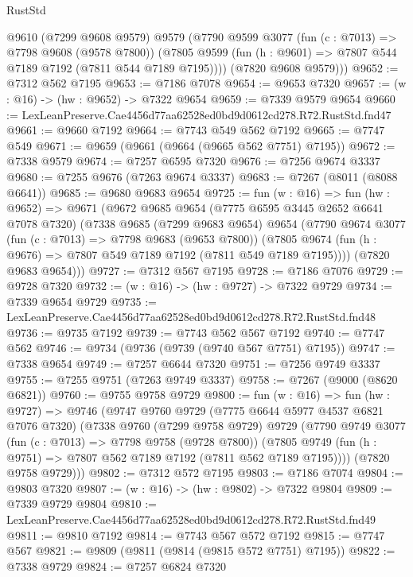 \begin{lexlean}{RustStd}
\begin{coremodule}
        @9610
        (@7299 @9608 @9579)
        @9579
        (@7790
          @9599
          @3077
          (fun (c : @7013) => @7798 @9608 (@9578 @7800))
          (@7805 @9599 (fun (h : @9601) => @7807 @544 @7189 @7192 (@7811 @544 @7189 @7195))))
        (@7820 @9608 @9579)))
@9652 := @7312 @562 @7195
@9653 := @7186 @7078
@9654 := @9653 @7320
@9657 := (w : @16) -> (hw : @9652) -> @7322 @9654
@9659 := @7339 @9579 @9654
@9660 := LexLeanPreserve.Cae4456d77aa62528ed0bd9d0612cd278.R72.RustStd.fnd47
@9661 := @9660 @7192
@9664 := @7743 @549 @562 @7192
@9665 := @7747 @549
@9671 := @9659 (@9661 (@9664 (@9665 @562 @7751) @7195))
@9672 := @7338 @9579
@9674 := @7257 @6595 @7320
@9676 := @7256 @9674 @3337
@9680 := @7255 @9676 (@7263 @9674 @3337)
@9683 := @7267 (@8011 (@8088 @6641))
@9685 := @9680 @9683 @9654
@9725 := fun (w : @16) =>
  fun (hw : @9652) =>
  @9671
    (@9672
      @9685
      @9654
      (@7775 @6595 @3445 @2652 @6641 @7078 @7320)
      (@7338
        @9685
        (@7299 @9683 @9654)
        @9654
        (@7790
          @9674
          @3077
          (fun (c : @7013) => @7798 @9683 (@9653 @7800))
          (@7805 @9674 (fun (h : @9676) => @7807 @549 @7189 @7192 (@7811 @549 @7189 @7195))))
        (@7820 @9683 @9654)))
@9727 := @7312 @567 @7195
@9728 := @7186 @7076
@9729 := @9728 @7320
@9732 := (w : @16) -> (hw : @9727) -> @7322 @9729
@9734 := @7339 @9654 @9729
@9735 := LexLeanPreserve.Cae4456d77aa62528ed0bd9d0612cd278.R72.RustStd.fnd48
@9736 := @9735 @7192
@9739 := @7743 @562 @567 @7192
@9740 := @7747 @562
@9746 := @9734 (@9736 (@9739 (@9740 @567 @7751) @7195))
@9747 := @7338 @9654
@9749 := @7257 @6644 @7320
@9751 := @7256 @9749 @3337
@9755 := @7255 @9751 (@7263 @9749 @3337)
@9758 := @7267 (@9000 (@8620 @6821))
@9760 := @9755 @9758 @9729
@9800 := fun (w : @16) =>
  fun (hw : @9727) =>
  @9746
    (@9747
      @9760
      @9729
      (@7775 @6644 @5977 @4537 @6821 @7076 @7320)
      (@7338
        @9760
        (@7299 @9758 @9729)
        @9729
        (@7790
          @9749
          @3077
          (fun (c : @7013) => @7798 @9758 (@9728 @7800))
          (@7805 @9749 (fun (h : @9751) => @7807 @562 @7189 @7192 (@7811 @562 @7189 @7195))))
        (@7820 @9758 @9729)))
@9802 := @7312 @572 @7195
@9803 := @7186 @7074
@9804 := @9803 @7320
@9807 := (w : @16) -> (hw : @9802) -> @7322 @9804
@9809 := @7339 @9729 @9804
@9810 := LexLeanPreserve.Cae4456d77aa62528ed0bd9d0612cd278.R72.RustStd.fnd49
@9811 := @9810 @7192
@9814 := @7743 @567 @572 @7192
@9815 := @7747 @567
@9821 := @9809 (@9811 (@9814 (@9815 @572 @7751) @7195))
@9822 := @7338 @9729
@9824 := @7257 @6824 @7320

\end{coremodule}
\end{lexlean}
